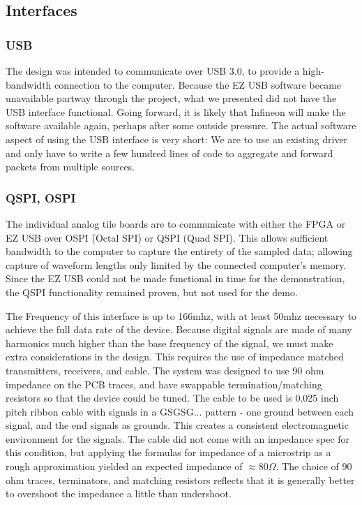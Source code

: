 \subsection{Interfaces}
	\subsubsection{USB}
	The design was intended to communicate over USB 3.0, to provide a high-bandwidth connection to the computer. Because the EZ USB software became unavailable partway through the project, what we presented did not have the USB interface functional. Going forward, it is likely that Infineon will make the software available again, perhaps after some outside pressure. The actual software aspect of using the USB interface is very short: We are to use an existing driver and only have to write a few hundred lines of code to aggregate and forward packets from multiple sources.

	\subsubsection{QSPI, OSPI}
	The individual analog tile boards are to communicate with either the FPGA or EZ USB over OSPI (Octal SPI) or QSPI (Quad SPI). This allows sufficient bandwidth to the computer to capture the entirety of the sampled data; allowing capture of waveform lengths only limited by the connected computer's memory. Since the EZ USB could not be made functional in time for the demonstration, the QSPI functionality remained proven, but not used for the demo.
	
	The Frequency of this interface is up to 166mhz, with at least 50mhz necessary to achieve the full data rate of the device. Because digital signals are made of many harmonics much higher than the base frequency of the signal, we must make extra considerations in the design. This requires the use of impedance matched transmitters, receivers, and cable. The system was designed to use 90 ohm impedance on the PCB traces, and have swappable termination/matching resistors so that the device could be tuned. The cable to be used is 0.025 inch pitch ribbon cable with signals in a GSGSG... pattern - one ground between each signal, and the end signals as grounds. This creates a consistent electromagnetic environment for the signals. The cable did not come with an impedance spec for this condition, but applying the formulas for impedance of a microstrip as a rough approximation yielded an expected impedance of $\approx80\Omega$. The choice of 90 ohm traces, terminators, and matching resistors reflects that it is generally better to overshoot the impedance a little than undershoot.
	
